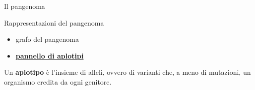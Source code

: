 \documentclass[]{beamer}
\begin{document}
\begin{frame}{Il pangenoma}
{\begin{block}{Rappresentazioni del pangenoma}
      \begin{itemize}
        \item grafo del pangenoma
        \item \underline{\textbf{pannello di aplotipi}}
      \end{itemize}
    \end{block}
    \begin{block}{}
      Un \textbf{aplotipo} è  l'insieme di alleli, ovvero di
      varianti che, a meno di mutazioni, un organismo eredita da ogni genitore.
    \end{block}
  }
\end{frame}
\end{document}
